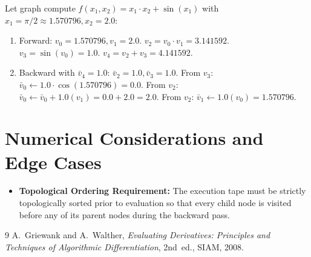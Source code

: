 \documentclass[11pt]{article}
\begin{document}
Let graph compute $f(x_1, x_2) = x_1 \cdot x_2 + \sin(x_1)$ with $x_1 = \pi/2 \approx 1.570796, x_2 = 2.0$:
\begin{enumerate}
    \item Forward:
    $v_0 = 1.570796, v_1 = 2.0$.
    $v_2 = v_0 \cdot v_1 = 3.141592$.
    $v_3 = \sin(v_0) = 1.0$.
    $v_4 = v_2 + v_3 = 4.141592$.
    \item Backward with $\bar{v}_4 = 1.0$:
    $\bar{v}_2 = 1.0, \bar{v}_3 = 1.0$.
    From $v_3$: $\bar{v}_0 \gets 1.0 \cdot \cos(1.570796) = 0.0$.
    From $v_2$: $\bar{v}_0 \gets \bar{v}_0 + 1.0(v_1) = 0.0 + 2.0 = 2.0$.
    From $v_2$: $\bar{v}_1 \gets 1.0(v_0) = 1.570796$.
\end{enumerate}

\section{Numerical Considerations and Edge Cases}
\label{sec:numerical}

\begin{itemize}
    \item \textbf{Topological Ordering Requirement:} The execution tape must be strictly topologically sorted prior to evaluation so that every child node is visited before any of its parent nodes during the backward pass.
\end{itemize}

\begin{thebibliography}{9}
 A.~Griewank and A.~Walther, \emph{Evaluating Derivatives: Principles and Techniques of Algorithmic Differentiation}, 2nd~ed., SIAM, 2008.
\end{thebibliography}
\end{document}
